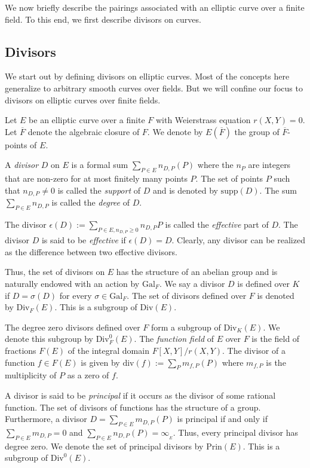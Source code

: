 \documentclass[11pt, lettersize, notitlepage, leqno, footskip=0.6cm]{article}
\newcommand{\slim}{\sum\limits}
\newcommand{\absf}{\mathrm{Gal}_F}
\newcommand{\divv}{\mathrm{div}}
\newcommand{\mr}{\mathrm}
\newcommand{\ov}{\overline}
\numberwithin{equation}{section}
\begin{document}
We now briefly describe the pairings associated with an elliptic curve over a finite field. To this end, we first describe divisors on curves.\\ 

\subsection{\fontsize{11}{11}\selectfont Divisors}

We start out by defining divisors on elliptic curves. Most of the concepts here generalize to arbitrary smooth curves over fields. But we will confine our focus to divisors on elliptic curves over finite fields.

Let $E$ be an elliptic curve over a finite $F$ with Weierstrass equation $r(X,Y) = 0$. Let $\ov{F}$ denote the algebraic closure of $F$. We denote by $E(\ov{F})$ the group of $\ov{F}$-points of $E$. 

A \textit{divisor} $D$ on $E$ is a formal sum $\slim_{P\in E}n_{D,P}(P) $ where the $n_P$ are integers that are non-zero for at most finitely many points $P$. The set of points $P$ such that $n_{D,P}\neq 0$ is called the \textit{support} of $D$ and is denoted by $\mr{supp}(D)$. The sum $\slim_{P\in E}n_{D,P}$ is called the \textit{degree} of $D$. 

The divisor $\epsilon(D):= \slim_{P\in E, n_{D,P}\geq 0} n_{D,P}P $ is called the \textit{effective} part of $D$. The divisor $D$ is said to be \textit{effective} if $\epsilon(D) = D$. Clearly, any divisor can be realized as the difference between two effective divisors.

Thus, the set of divisors on $E$ has the structure of an abelian group and is naturally endowed with an action by $\absf$. We say a divisor $D$ is defined over $K$ if $D = \sigma(D)$ for every $\sigma\in \absf$. The set of divisors defined over $F$ is denoted by $\mr{Div}_F(E)$. This is a subgroup of $\mr{Div}(E)$.

The degree zero divisors defined over $F$ form a subgroup of $\mr{Div}_K(E)$. We denote this subgroup by $\mr{Div}_F^0(E)$. The \textit{function field} of $E$ over $F$ is the field of fractions $F(E)$ of the integral domain $F[X,Y]/r(X,Y).$ The divisor of a function $f\in F(E)$ is given by $\divv(f):= \slim_{P} m_{f,P}(P)$ where $m_{f,P}$ is the multiplicity of $P$ as a zero of $f$. 

A divisor is said to be \textit{principal} if it occurs as the divisor of some rational function. The set of divisors of functions has the structure of a group. Furthermore, a divisor $D= \slim_{P\in E}m_{D,P}(P)$ is principal if and only if $\slim_{P\in E}m_{D,P} = 0$ and $\slim_{P\in E}n_{D,P}(P) = \infty_{_E}$. Thus, every principal divisor has degree zero. We denote the set of principal divisors by $\mr{Prin}(E)$. This is a subgroup of $\mr{Div}^0(E)$.
\end{document}
